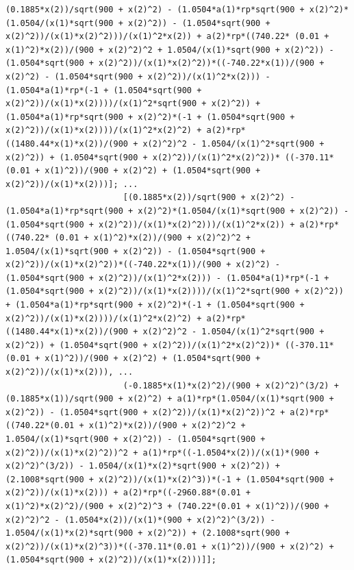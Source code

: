 \documentclass[10pt, a4paper]{article}
\begin{document}
\begin{minipage}{\linewidth}
      \begin{lstlisting}[style=myStyle, caption= trecho de c\'odigo do problema 02 (penalidade) (2/2), label=list_p02_pen_2]
                        (0.1885*x(2))/sqrt(900 + x(2)^2) - (1.0504*a(1)*rp*sqrt(900 + x(2)^2)*(1.0504/(x(1)*sqrt(900 + x(2)^2)) - (1.0504*sqrt(900 + x(2)^2))/(x(1)*x(2)^2)))/(x(1)^2*x(2)) + a(2)*rp*((740.22* (0.01 + x(1)^2)*x(2))/(900 + x(2)^2)^2 + 1.0504/(x(1)*sqrt(900 + x(2)^2)) - (1.0504*sqrt(900 + x(2)^2))/(x(1)*x(2)^2))*((-740.22*x(1))/(900 + x(2)^2) - (1.0504*sqrt(900 + x(2)^2))/(x(1)^2*x(2))) - (1.0504*a(1)*rp*(-1 + (1.0504*sqrt(900 + x(2)^2))/(x(1)*x(2))))/(x(1)^2*sqrt(900 + x(2)^2)) + (1.0504*a(1)*rp*sqrt(900 + x(2)^2)*(-1 + (1.0504*sqrt(900 + x(2)^2))/(x(1)*x(2))))/(x(1)^2*x(2)^2) + a(2)*rp*((1480.44*x(1)*x(2))/(900 + x(2)^2)^2 - 1.0504/(x(1)^2*sqrt(900 + x(2)^2)) + (1.0504*sqrt(900 + x(2)^2))/(x(1)^2*x(2)^2))* ((-370.11*(0.01 + x(1)^2))/(900 + x(2)^2) + (1.0504*sqrt(900 + x(2)^2))/(x(1)*x(2)))]; ...
                        [(0.1885*x(2))/sqrt(900 + x(2)^2) - (1.0504*a(1)*rp*sqrt(900 + x(2)^2)*(1.0504/(x(1)*sqrt(900 + x(2)^2)) - (1.0504*sqrt(900 + x(2)^2))/(x(1)*x(2)^2)))/(x(1)^2*x(2)) + a(2)*rp*((740.22* (0.01 + x(1)^2)*x(2))/(900 + x(2)^2)^2 + 1.0504/(x(1)*sqrt(900 + x(2)^2)) - (1.0504*sqrt(900 + x(2)^2))/(x(1)*x(2)^2))*((-740.22*x(1))/(900 + x(2)^2) - (1.0504*sqrt(900 + x(2)^2))/(x(1)^2*x(2))) - (1.0504*a(1)*rp*(-1 + (1.0504*sqrt(900 + x(2)^2))/(x(1)*x(2))))/(x(1)^2*sqrt(900 + x(2)^2)) + (1.0504*a(1)*rp*sqrt(900 + x(2)^2)*(-1 + (1.0504*sqrt(900 + x(2)^2))/(x(1)*x(2))))/(x(1)^2*x(2)^2) + a(2)*rp*((1480.44*x(1)*x(2))/(900 + x(2)^2)^2 - 1.0504/(x(1)^2*sqrt(900 + x(2)^2)) + (1.0504*sqrt(900 + x(2)^2))/(x(1)^2*x(2)^2))* ((-370.11*(0.01 + x(1)^2))/(900 + x(2)^2) + (1.0504*sqrt(900 + x(2)^2))/(x(1)*x(2))), ...
                        (-0.1885*x(1)*x(2)^2)/(900 + x(2)^2)^(3/2) + (0.1885*x(1))/sqrt(900 + x(2)^2) + a(1)*rp*(1.0504/(x(1)*sqrt(900 + x(2)^2)) - (1.0504*sqrt(900 + x(2)^2))/(x(1)*x(2)^2))^2 + a(2)*rp*((740.22*(0.01 + x(1)^2)*x(2))/(900 + x(2)^2)^2 + 1.0504/(x(1)*sqrt(900 + x(2)^2)) - (1.0504*sqrt(900 + x(2)^2))/(x(1)*x(2)^2))^2 + a(1)*rp*((-1.0504*x(2))/(x(1)*(900 + x(2)^2)^(3/2)) - 1.0504/(x(1)*x(2)*sqrt(900 + x(2)^2)) + (2.1008*sqrt(900 + x(2)^2))/(x(1)*x(2)^3))*(-1 + (1.0504*sqrt(900 + x(2)^2))/(x(1)*x(2))) + a(2)*rp*((-2960.88*(0.01 + x(1)^2)*x(2)^2)/(900 + x(2)^2)^3 + (740.22*(0.01 + x(1)^2))/(900 + x(2)^2)^2 - (1.0504*x(2))/(x(1)*(900 + x(2)^2)^(3/2)) - 1.0504/(x(1)*x(2)*sqrt(900 + x(2)^2)) + (2.1008*sqrt(900 + x(2)^2))/(x(1)*x(2)^3))*((-370.11*(0.01 + x(1)^2))/(900 + x(2)^2) + (1.0504*sqrt(900 + x(2)^2))/(x(1)*x(2)))]];


\end{lstlisting}
\end{minipage}
\end{document}
